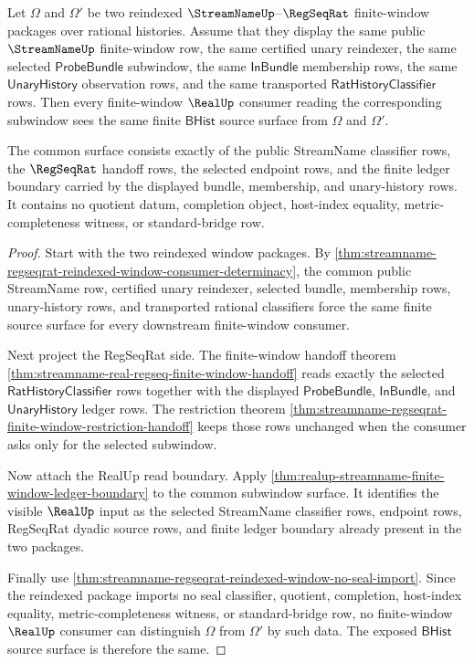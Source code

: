 \begin{theorem}
\label{thm:streamname-realup-subwindow-ledger-determinacy}
Let $\Omega$ and $\Omega'$ be two reindexed
$\StreamNameUp$--$\RegSeqRat$ finite-window packages over rational histories.
Assume that they display the same public $\StreamNameUp$ finite-window row, the
same certified unary reindexer, the same selected
$\mathsf{ProbeBundle}$ subwindow, the same $\mathsf{InBundle}$ membership rows,
the same $\mathsf{UnaryHistory}$ observation rows, and the same transported
$\mathsf{RatHistoryClassifier}$ rows. Then every finite-window $\RealUp$
consumer reading the corresponding subwindow sees the same finite
$\mathsf{BHist}$ source surface from $\Omega$ and $\Omega'$.

The common surface consists exactly of the public StreamName classifier rows,
the $\RegSeqRat$ handoff rows, the selected endpoint rows, and the finite
ledger boundary carried by the displayed bundle, membership, and unary-history
rows. It contains no quotient datum, completion object, host-index equality,
metric-completeness witness, or standard-bridge row.
\end{theorem}
\begin{proof}
Start with the two reindexed window packages. By
\autoref{thm:streamname-regseqrat-reindexed-window-consumer-determinacy}, the
common public StreamName row, certified unary reindexer, selected bundle,
membership rows, unary-history rows, and transported rational classifiers force
the same finite source surface for every downstream finite-window consumer.

Next project the RegSeqRat side. The finite-window handoff theorem
\autoref{thm:streamname-real-regseq-finite-window-handoff} reads exactly the
selected $\mathsf{RatHistoryClassifier}$ rows together with the displayed
$\mathsf{ProbeBundle}$, $\mathsf{InBundle}$, and $\mathsf{UnaryHistory}$ ledger
rows. The restriction theorem
\autoref{thm:streamname-regseqrat-finite-window-restriction-handoff} keeps
those rows unchanged when the consumer asks only for the selected subwindow.

Now attach the RealUp read boundary. Apply
\autoref{thm:realup-streamname-finite-window-ledger-boundary} to the common
subwindow surface. It identifies the visible $\RealUp$ input as the selected
StreamName classifier rows, endpoint rows, RegSeqRat dyadic source rows, and
finite ledger boundary already present in the two packages.

Finally use
\autoref{thm:streamname-regseqrat-reindexed-window-no-seal-import}. Since the
reindexed package imports no seal classifier, quotient, completion,
host-index equality, metric-completeness witness, or standard-bridge row, no
finite-window $\RealUp$ consumer can distinguish $\Omega$ from $\Omega'$ by
such data. The exposed $\mathsf{BHist}$ source surface is therefore the same.
\end{proof}

